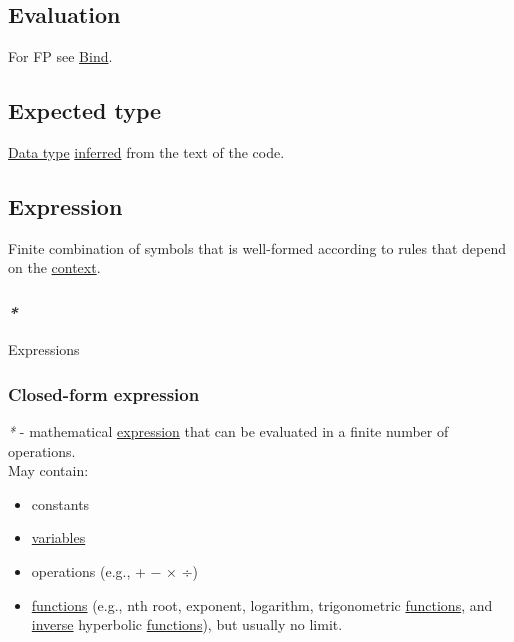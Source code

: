 \documentclass[11pt]{article}
\begin{document}
\subsection{\label{org5445907}Evaluation}
\label{sec:org77e5c2a}
For FP see \hyperref[org8b7f62c]{Bind}.\\

\subsection{\label{org48c1729}Expected type}
\label{sec:orgb6edf89}
\hyperref[org965cde3]{Data type} \hyperref[org76b4540]{inferred} from the text of the code.\\

\subsection{\label{org667db83}Expression}
\label{sec:org9554b68}
Finite combination of symbols that is well-formed according to rules that depend on the \hyperref[orgd623681]{context}.\\

\subsubsection{\emph{*}}
\label{sec:org14e1fc9}

\label{org9eb2c72}Expressions\\

\subsubsection{\label{org593d4f6}Closed-form expression}
\label{sec:orgae234d7}
\emph{*} - mathematical \hyperref[org667db83]{expression} that can be evaluated in a finite number of operations.\\

May contain:\\
\begin{itemize}
\item constants\\
\item \hyperref[orgd3f3ade]{variables}\\
\item operations (e.g., + − × ÷)\\
\item \hyperref[org66c5288]{functions} (e.g., nth root, exponent, logarithm, trigonometric \hyperref[org66c5288]{functions}, and \hyperref[org41275e7]{inverse} hyperbolic \hyperref[org66c5288]{functions}), but usually no limit.\\
\end{itemize}
\end{document}
